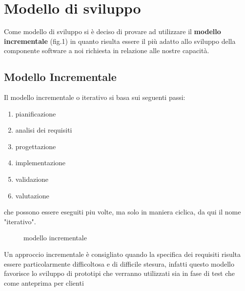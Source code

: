 \section{Modello di sviluppo}
	Come modello di sviluppo si è deciso di provare ad utilizzare il \textbf{modello incrementale} (fig.1) in quanto risulta essere il più adatto allo sviluppo della componente software a noi richiesta in relazione alle nostre capacità. 
	
	\subsection{Modello Incrementale}
		Il modello incrementale o iterativo si basa sui seguenti passi:
		\begin{enumerate}
			\item pianificazione
			\item analisi dei requisiti
			\item progettazione
			\item implementazione
			\item validazione
			\item valutazione
		\end{enumerate}
		che possono essere eseguiti piu volte, ma solo in maniera ciclica, da qui il nome "iterativo".
		
		\begin{figure}
			\centering
			\caption{modello incrementale}\label{fig:1}
		\end{figure}
		
		Un approccio incrementale è consigliato quando la specifica dei requisiti risulta essere particolarmente difficoltosa e di difficile stesura, infatti questo modello favorisce lo sviluppo di prototipi che verranno utilizzati sia in fase di test che come anteprima per clienti